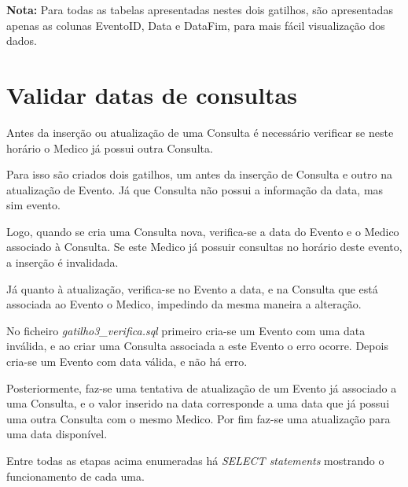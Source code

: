 \documentclass[article, a4paper, 12pt, oneside]{memoir}
\begin{document}
\textbf{Nota:} Para todas as tabelas apresentadas nestes dois gatilhos, são apresentadas apenas as colunas EventoID, Data e DataFim, para mais fácil visualização dos dados.

\section{Validar datas de consultas}

Antes da inserção ou atualização de uma Consulta é necessário verificar se neste horário o Medico já possui outra Consulta.

Para isso são criados dois gatilhos, um antes da inserção de Consulta e outro na atualização de Evento. Já que Consulta não possui a informação da data, mas sim evento.

Logo, quando se cria uma Consulta nova, verifica-se a data do Evento e o Medico associado à Consulta. Se este Medico já possuir consultas no horário deste evento, a inserção é invalidada.

Já quanto à atualização, verifica-se no Evento a data, e na Consulta que está associada ao Evento o Medico, impedindo da mesma maneira a alteração.

No ficheiro \textit{gatilho3\_verifica.sql} primeiro cria-se um Evento com uma data inválida, e ao criar uma Consulta associada a este Evento o erro ocorre.
Depois cria-se um Evento com data válida, e não há erro.

Posteriormente, faz-se uma tentativa de atualização de um Evento já associado a uma Consulta, e o valor inserido na data corresponde a uma data que já possui uma outra Consulta com o mesmo Medico. Por fim faz-se uma atualização para uma data disponível.

Entre todas as etapas acima enumeradas há \textit{SELECT statements} mostrando o funcionamento de cada uma.
\end{document}
